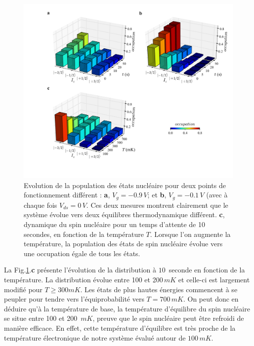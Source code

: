 \begin{figure}[h!]
\includegraphics[scale=0.45]{Resultats/SpinTemp/SpinTemp.pdf} 
\caption{Evolution de la population des états nucléaire pour deux points de fonctionnement différent : \textbf{a}, $V_g = -0.9\,V$; et \textbf{b}, $V_g = -0.1\,V$ (avec à chaque fois $V_{ds} = 0\,V$. Ces deux mesures montrent clairement que le système évolue vers deux équilibres thermodynamique différent. \textbf{c}, dynamique du spin nucléaire pour un temps d'attente de 10 secondes, en fonction de la température $T$. Lorsque l'on augmente la température, la population des états de spin nucléaire évolue vers une occupation égale de tous les états.}
\label{dynamique_spin}
\end{figure}


La Fig.\ref{dynamique_spin}.\textbf{c} présente l'évolution de la distribution à $10\,$ seconde en fonction de la température. La distribution évolue entre 100 et 200$\,mK$ et celle-ci est largement modifié pour $T\geq 300mK$. Les états de plus hautes énergies commencent à se peupler pour tendre vers l'équiprobabilité vers $T=700\,mK$. On peut donc en déduire qu'à la température de base, la température d'équilibre du spin nucléaire se situe entre 100 et 200 $\,mK$, preuve que le spin nucléaire peut être refroidi de manière efficace. En effet, cette température d'équilibre est très proche de la température électronique de notre système évalué autour de $100\,mK$.
